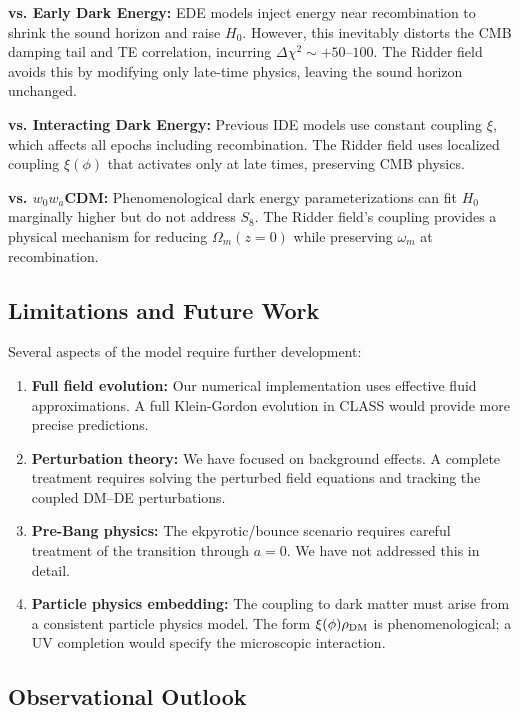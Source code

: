 \documentclass[twocolumn,showpacs,preprintnumbers,amsmath,amssymb,prd]{revtex4-2}
\begin{document}
\textbf{vs. Early Dark Energy:} EDE models inject energy near recombination to shrink the sound horizon and raise $H_0$. However, this inevitably distorts the CMB damping tail and TE correlation, incurring $\Delta\chi^2 \sim +50$--$100$. The Ridder field avoids this by modifying only late-time physics, leaving the sound horizon unchanged.

\textbf{vs. Interacting Dark Energy:} Previous IDE models use constant coupling $\xi$, which affects all epochs including recombination. The Ridder field uses localized coupling $\xi(\phi)$ that activates only at late times, preserving CMB physics.

\textbf{vs. $w_0w_a$CDM:} Phenomenological dark energy parameterizations can fit $H_0$ marginally higher but do not address $S_8$. The Ridder field's coupling provides a physical mechanism for reducing $\Omega_m(z=0)$ while preserving $\omega_m$ at recombination.

\subsection{Limitations and Future Work}

Several aspects of the model require further development:

\begin{enumerate}
    \item \textbf{Full field evolution:} Our numerical implementation uses effective fluid approximations. A full Klein-Gordon evolution in CLASS would provide more precise predictions.
    
    \item \textbf{Perturbation theory:} We have focused on background effects. A complete treatment requires solving the perturbed field equations and tracking the coupled DM--DE perturbations.
    
    \item \textbf{Pre-Bang physics:} The ekpyrotic/bounce scenario requires careful treatment of the transition through $a = 0$. We have not addressed this in detail.
    
    \item \textbf{Particle physics embedding:} The coupling to dark matter must arise from a consistent particle physics model. The form $\xi(\phi)\rho_{\rm DM}$ is phenomenological; a UV completion would specify the microscopic interaction.
\end{enumerate}

\subsection{Observational Outlook}
\end{document}

